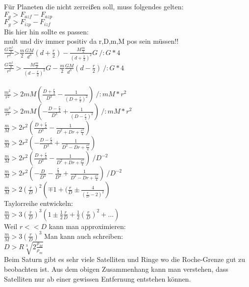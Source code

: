 Für Planeten die nicht zerreißen soll, muss folgendes gelten:\\
$F_g > F_{azf} - F_{azp}$\\
$F_g > F_{izp} - F_{izf}$\\
Bis hier hin sollte es passen:\\
mult und div immer positiv da r,D,m,M pos sein müssen!!\\
$\frac{G\frac{m^2}{4}}{r^2}\text{>}\frac{m}{2}\frac{G M}{d^3}\left(d+\frac{r}{2}\right) - \frac{M \frac{m}{2}}{\left(d+\frac{r}{2}\right)^2}G ~ / :G *4$ \\
$\frac{G\frac{m^2}{4}}{r^2}> \frac{M \frac{m}{2}}{\left(d-\frac{r}{2}\right)^2}G-\frac{m}{2}\frac{G M}{d^3}\left(d-\frac{r}{2}\right) ~ / :G *4$\\
\\
$\frac{m^2}{r^2}>2 m M \left(\frac{D+\frac{r}{2}}{D^3}-\frac{1}{\left(D+\frac{r}{2}\right)^2}\right)~/:mM *r^2$ \\ 
$\frac{m^2}{r^2}>2 m M \left(-\frac{D-\frac{r}{2}}{D^3}+\frac{1}{\left(D-\frac{r}{2}\right)^2}\right)~/:mM *r^2$\\
$\frac{m}{M}>2 r^2 \left(\frac{D+\frac{r}{2}}{D^3}-\frac{1}{D^2+D r+\frac{r^2}{4}}\right)$ \\ 
$\frac{m}{M}>2 r^2 \left(-\frac{D-\frac{r}{2}}{D^3}+\frac{1}{D^2-D r+\frac{r^2}{4}}\right)$\\
$\frac{m}{M}>2 r^2 \left(\frac{D+\frac{r}{2}}{D^3}-\frac{1}{D^2+D r+\frac{r^2}{4}}\right)~/D^{-2}$ \\ 
$\frac{m}{M}>2 r^2 \left(-\frac{D}{D^3} -\frac{\frac{r}{2}}{D^3} +\frac{1}{D^2-D r+\frac{r^2}{4}}\right)~/D^{-2}$\\
$\frac{m}{M}>2 \left(\frac{r}{D}\right)^2 \left(\mp 1 + (\frac{r}{D} \pm \frac{4}{\left(\frac{r}{D}-2\right)^2}\right)$ \\ 
Taylorreihe entwickeln:\\
$\frac{m}{M}>3 \left(\frac{r}{D}\right)^3 \left( 1 \pm \frac{1}{2}\frac{r}{D} + \frac{1}{2}\left(\frac{r}{D}\right)^2 + ... \right)$ \\ 
Weil $r << D$ kann man approximieren:\\
$\frac{m}{M}>3 \left(\frac{r}{D}\right)^3$
Man kann auch schreiben:\\
$D > R \sqrt[3]{2 \frac{\rho_M}{\rho_m}}$\textsuperscript{\cite{wiki:xxx}}\\
Beim Saturn gibt es sehr viele Satelliten und Ringe wo die Roche-Grenze gut zu beobachten ist. Aus dem obigen Zusammenhang kann man verstehen, dass Satelliten nur ab einer gewissen Entfernung entstehen können. 
